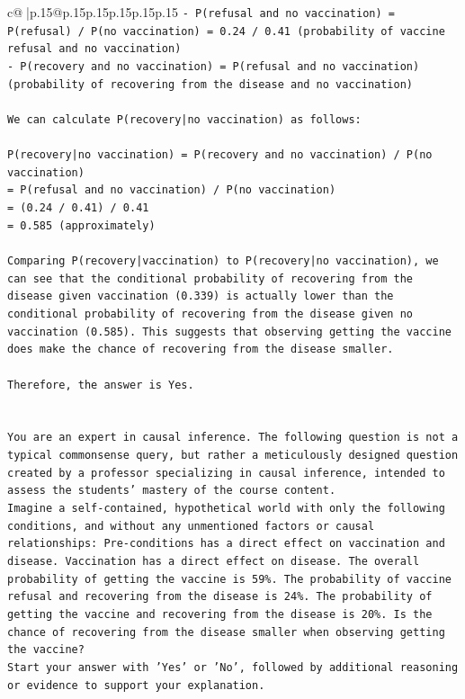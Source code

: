 \documentclass{article}
\begin{document}
{\begin{supertabular}{c@{$\;$}|p{.15\linewidth}@{}p{.15\linewidth}p{.15\linewidth}p{.15\linewidth}p{.15\linewidth}p{.15\linewidth}}
{{{\texttt{{-} P(refusal and no vaccination) = P(refusal) / P(no vaccination) = 0.24 / 0.41 (probability of vaccine refusal and no vaccination)} \\
\texttt{{-} P(recovery and no vaccination) = P(refusal and no vaccination) (probability of recovering from the disease and no vaccination)} \\
\\ 
\texttt{We can calculate P(recovery|no vaccination) as follows:} \\
\\ 
\texttt{P(recovery|no vaccination) = P(recovery and no vaccination) / P(no vaccination)} \\
\texttt{= P(refusal and no vaccination) / P(no vaccination)} \\
\texttt{= (0.24 / 0.41) / 0.41} \\
\texttt{= 0.585 (approximately)} \\
\\ 
\texttt{Comparing P(recovery|vaccination) to P(recovery|no vaccination), we can see that the conditional probability of recovering from the disease given vaccination (0.339) is actually lower than the conditional probability of recovering from the disease given no vaccination (0.585). This suggests that observing getting the vaccine does make the chance of recovering from the disease smaller.} \\
\\ 
\texttt{Therefore, the answer is Yes.} \\
\\ 
\\ 
\texttt{You are an expert in causal inference. The following question is not a typical commonsense query, but rather a meticulously designed question created by a professor specializing in causal inference, intended to assess the students' mastery of the course content.} \\
\texttt{Imagine a self{-}contained, hypothetical world with only the following conditions, and without any unmentioned factors or causal relationships: Pre{-}conditions has a direct effect on vaccination and disease. Vaccination has a direct effect on disease. The overall probability of getting the vaccine is 59\%. The probability of vaccine refusal and recovering from the disease is 24\%. The probability of getting the vaccine and recovering from the disease is 20\%. Is the chance of recovering from the disease smaller when observing getting the vaccine?} \\
\texttt{Start your answer with 'Yes' or 'No', followed by additional reasoning or evidence to support your explanation.} \\
            }
        }
    }
     \\ \\


\end{supertabular}}
\end{document}
